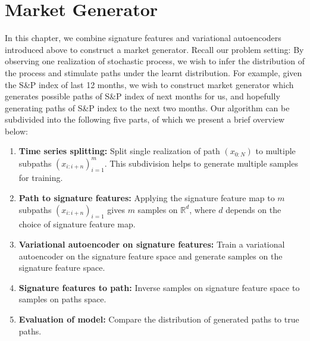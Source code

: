 \documentclass[12pt]{report}
\theoremstyle{definition}
\theoremstyle{remark}
\newcommand{\R}{\mathbb{R}}
\begin{document}
\chapter{Market Generator}
In this chapter, we combine signature features and variational autoencoders introduced above to construct a market generator. Recall our problem setting: By observing one realization of stochastic process, we wish to infer the distribution of the process and stimulate paths under the learnt distribution. For example, given the S\&P index of last 12 months, we wish to construct market generator which generates possible paths of S\&P index of next months for us, and hopefully generating paths of S\&P index to the next two months. Our algorithm can be subdivided into the following five parts, of which we present a brief overview below:
\begin{enumerate}[start=1,label={( Step \arabic*):}]
  \item \textbf{Time series splitting:} Split single realization of path $(x_{0:N})$ to multiple subpaths $(x_{i:i+n})_{i=1}^{m}$. This subdivision helps to generate multiple samples for training. 
  \item \textbf{Path to signature features:} Applying the signature feature map to $m$ subpaths $(x_{i:i+n})_{i=1}$ gives $m$ samples on $\R^{d}$, where $d$ depends on the choice of signature feature map.   
  \item \textbf{Variational autoencoder on signature features: } Train a variational autoencoder on the signature feature space and generate samples on the signature feature space.  
  \item \textbf{Signature features to path:} Inverse samples on signature feature space to samples on paths space. 
  \item \textbf{Evaluation of model:} Compare the distribution of generated paths to true paths. 
\end{enumerate}
\end{document}
